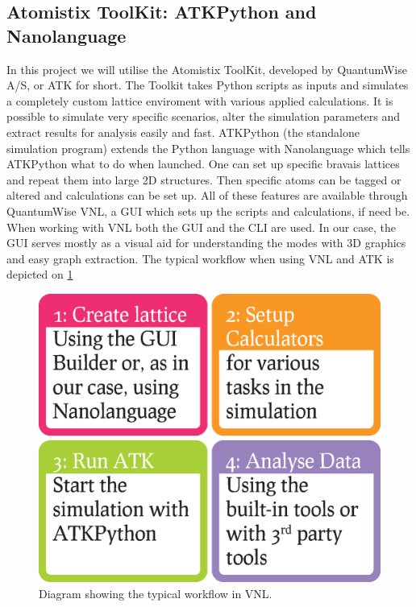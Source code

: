 
\subsection{Atomistix ToolKit: ATKPython and Nanolanguage}
In this project we will utilise the Atomistix ToolKit, developed by QuantumWise A/S\cite{QuantumWise}, or ATK for short. The Toolkit takes Python scripts as inputs and simulates a completely custom lattice enviroment with various applied calculations. It is possible to simulate very specific scenarios, alter the simulation parameters and extract results for analysis easily and fast.
ATKPython (the standalone simulation program) extends the Python language with Nanolanguage which tells ATKPython what to do when launched. One can set up specific bravais lattices and repeat them into large 2D structures. Then specific atoms can be tagged or altered and calculations can be set up. All of these features are available through QuantumWise VNL, a GUI which sets up the scripts and calculations, if need be. When working with VNL both the GUI and the CLI are used. In our case, the GUI serves mostly as a visual aid for understanding the modes with 3D graphics and easy graph extraction. The typical workflow when using VNL and ATK is depicted on \cref{workflow}
\begin{figure}
  \centering
  \includegraphics[width=\columnwidth]{Figures/Workflow.eps}
  \caption{Diagram showing the typical workflow in VNL.}
  \label{workflow}
\end{figure}
